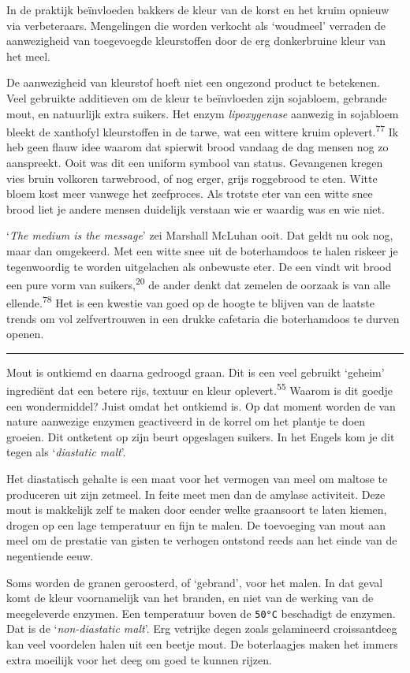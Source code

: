 \documentclass[
  11pt,
  dutch,
]{memoir}
\begin{document}
In de praktijk beïnvloeden bakkers de kleur van de korst en het kruim
opnieuw via verbeteraars. Mengelingen die worden verkocht als `woudmeel'
verraden de aanwezigheid van toegevoegde kleurstoffen door de erg
donkerbruine kleur van het meel.

De aanwezigheid van kleurstof hoeft niet een ongezond product te
betekenen. Veel gebruikte additieven om de kleur te beïnvloeden zijn
sojabloem, gebrande mout, en natuurlijk extra suikers. Het enzym
\emph{lipoxygenase} aanwezig in sojabloem bleekt de xanthofyl
kleurstoffen in de tarwe, wat een wittere kruim
oplevert.\textsuperscript{77} Ik heb geen flauw idee waarom dat spierwit
brood vandaag de dag mensen nog zo aanspreekt. Ooit was dit een uniform
symbool van status. Gevangenen kregen vies bruin volkoren tarwebrood, of
nog erger, grijs roggebrood te eten. Witte bloem kost meer vanwege het
zeefproces. Als trotste eter van een witte snee brood liet je andere
mensen duidelijk verstaan wie er waardig was en wie niet.

`\emph{The medium is the message}' zei Marshall McLuhan ooit. Dat geldt
nu ook nog, maar dan omgekeerd. Met een witte snee uit de boterhamdoos
te halen riskeer je tegenwoordig te worden uitgelachen als onbewuste
eter. De een vindt wit brood een pure vorm van
suikers,\textsuperscript{20} de ander denkt dat zemelen de oorzaak is
van alle ellende.\textsuperscript{78} Het is een kwestie van goed op de
hoogte te blijven van de laatste trends om vol zelfvertrouwen in een
drukke cafetaria die boterhamdoos te durven openen.

\pfbreak

Mout is ontkiemd en daarna gedroogd graan. Dit is een veel gebruikt
`geheim' ingrediënt dat een betere rijs, textuur en kleur
oplevert.\textsuperscript{55} Waarom is dit goedje een wondermiddel?
Juist omdat het ontkiemd is. Op dat moment worden de van nature
aanwezige enzymen geactiveerd in de korrel om het plantje te doen
groeien. Dit ontketent op zijn beurt opgeslagen suikers. In het Engels
kom je dit tegen als `\emph{diastatic malt}'.

Het diastatisch gehalte is een maat voor het vermogen van meel om
maltose te produceren uit zijn zetmeel. In feite meet men dan de amylase
activiteit. Deze mout is makkelijk zelf te maken door eender welke
graansoort te laten kiemen, drogen op een lage temperatuur en fijn te
malen. De toevoeging van mout aan meel om de prestatie van gisten te
verhogen ontstond reeds aan het einde van de negentiende eeuw.

Soms worden de granen geroosterd, of `gebrand', voor het malen. In dat
geval komt de kleur voornamelijk van het branden, en niet van de werking
van de meegeleverde enzymen. Een temperatuur boven de \texttt{50°C}
beschadigt de enzymen. Dat is de `\emph{non-diastatic malt}'. Erg
vetrijke degen zoals gelamineerd croissantdeeg kan veel voordelen halen
uit een beetje mout. De boterlaagjes maken het immers extra moeilijk
voor het deeg om goed te kunnen rijzen.
\end{document}
